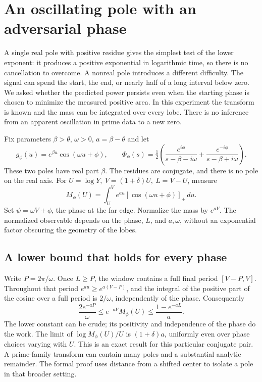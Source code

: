 \documentclass[12pt,letterpaper]{article}
\begin{document}
\section{An oscillating pole with an adversarial phase}
A single real pole with positive residue gives the simplest test of the lower exponent: it produces a positive exponential in logarithmic time, so there is no cancellation to overcome. A nonreal pole introduces a different difficulty. The signal can spend the start, the end, or nearly half of a long interval below zero. We asked whether the predicted power persists even when the starting phase is chosen to minimize the measured positive area. In this experiment the transform is known and the mass can be integrated over every lobe. There is no inference from an apparent oscillation in prime data to a new zero.

Fix parameters \(\beta>\theta\), \(\omega>0\), \(a=\beta-\theta\) and let
\[
   g_\phi(u)=e^{\beta u}\cos(\omega u+\phi),\qquad
   \Phi_\phi(s)=\tfrac12\left(\frac{e^{i\phi}}{s-\beta-i\omega}+
                           \frac{e^{-i\phi}}{s-\beta+i\omega}\right).
\]
These two poles have real part \(\beta\). The residues are conjugate, and there is no pole on the real axis. For \(U=\log Y,\ V=(1+\delta)U,\ L=V-U\), measure
\[
 M_\phi(U)=\int_U^V e^{au}[\cos(\omega u+\phi)]_+\,du.
\]
Set \(\psi=\omega V+\phi\), the phase at the far edge. Normalize the mass by \(e^{aV}\). The normalized observable depends on the phase, \(L\), and \(a,\omega\), without an exponential factor obscuring the geometry of the lobes.

\subsection{A lower bound that holds for every phase}
Write \(P=2\pi/\omega\). Once \(L\ge P\), the window contains a full final period \([V-P,V]\). Throughout that period \(e^{au}\ge e^{a(V-P)}\), and the integral of the positive part of the cosine over a full period is \(2/\omega\), independently of the phase. Consequently
\[
       \frac{2e^{-aP}}{\omega}\le e^{-aV}M_\phi(U)
           \le \frac{1-e^{-aL}}{a}.
\]
The lower constant can be crude; its positivity and independence of the phase do the work. The limit of \(\log M_\phi(U)/U\) is \((1+\delta)a\), uniformly even over phase choices varying with \(U\). This is an exact result for this particular conjugate pair. A prime-family transform can contain many poles and a substantial analytic remainder. The formal proof uses distance from a shifted center to isolate a pole in that broader setting.
\end{document}
